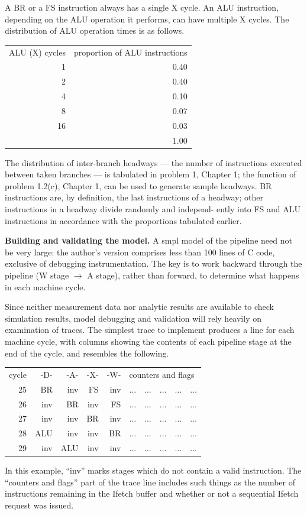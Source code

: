 A BR or a FS instruction always has a single X cycle. An ALU instruction,
depending on the ALU operation it performs, can have multiple X cycles.
The distribution of ALU operation times is as follows.
\begin{center}
\begin{tabular}{rr}
ALU (X) cycles & proportion of ALU instructions \\
1 & 0.40 \\
2 & 0.40 \\
4 & 0.10 \\
8 & 0.07 \\
16 & 0.03 \\
 & 1.00
\end{tabular}
\end{center}

The distribution of inter-branch headways --- the number of instructions
executed between taken branches --- is tabulated in problem 1, Chapter 1; the
function of problem 1.2(c), Chapter 1, can be used to generate sample
headways. BR instructions are, by definition, the last instructions of a
headway; other instructions in a headway divide randomly and independ-
\noindent ently into FS and ALU instructions in accordance with the proportions
tabulated earlier.

\noindent\textbf{Building and validating the model.} A smpl model of the pipeline need
not be very large: the author's version comprises less than 100 lines of C code,
exclusive of debugging instrumentation. The key is to work backward
through the pipeline (W stage $\rightarrow$ A stage), rather than forward, to determine
what happens in each machine cycle.

Since neither measurement data nor analytic results are available to
check simulation results, model debugging and validation will rely heavily
on examination of traces. The simplest trace to implement produces a line for
each machine cycle, with columns showing the contents of each pipeline
stage at the end of the cycle, and resembles the following.
\begin{center}
\begin{tabular}{rrrrrl}
cycle & -D- & -A- & -X- & -W- & counters and flags \\
25 & BR & inv & FS & inv & $\ldots\quad\ldots\quad\ldots\quad\ldots\quad\ldots$ \\
26 & inv & BR & inv & FS & $\ldots\quad\ldots\quad\ldots\quad\ldots\quad\ldots$ \\
27 & inv & inv & BR & inv & $\ldots\quad\ldots\quad\ldots\quad\ldots\quad\ldots$ \\
28 & ALU & inv & inv & BR & $\ldots\quad\ldots\quad\ldots\quad\ldots\quad\ldots$ \\
29 & inv & ALU & inv & inv & $\ldots\quad\ldots\quad\ldots\quad\ldots\quad\ldots$
\end{tabular}
\end{center}
In this example, ``inv'' marks stages which do not contain a valid instruction.
The ``counters and flags'' part of the trace line includes such things as the
number of instructions remaining in the Ifetch buffer and whether or not a
sequential Ifetch request was issued.

